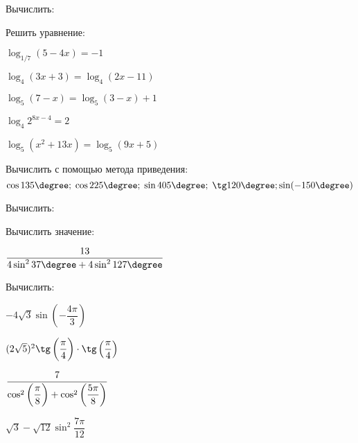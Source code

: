 \begin{listofex}
	\item Вычислить:
	\begin{enumcols}[itemcolumns=3]
		\item {}
		\item {}
		\item {}
		\item {}
		\item {}
		\item {}
		\item {}
	\end{enumcols}
	\item Решить уравнение:
	\begin{enumcols}[itemcolumns=2]
		\item \( \log_{1/7}(5-4x)=-1 \)
		\item \( \log_4(3x+3)=\log_4(2x-11) \)
		\item \( \log_5(7-x)=\log_5(3-x)+1 \)
		\item \( \log_4 2^{8x-4}=2 \)
		\item {}
		\item \( \log_5(x^2+13x)=\log_5(9x+5) \)
	\end{enumcols}
	\item Вычислить с помощью метода приведения:
	\[ \cos135\degree;\;\cos225\degree;\;\sin405\degree;\;\tg120\degree;\sin(-150\degree) \]
	\item Вычислить:
	\begin{enumcols}[itemcolumns=3]
		\item {}
		\item {}
		\item {}
		\item {}
		\item {}
	\end{enumcols}
	\item Вычислить значение:
	\begin{enumcols}[itemcolumns=3]
		\item {}
		\item \( \dfrac{13}{4\sin^237\degree+4\sin^2127\degree} \)
		\item {}
	\end{enumcols}
	\item Вычислить:
	\begin{enumcols}[itemcolumns=2]
		\item \( -4\sqrt{3}\sin\left( -\dfrac{4\pi}{3} \right) \)
		\item \( (2\sqrt{5})^2\tg\left( \dfrac{\vphantom{3}\pi}{4} \right)\cdot\tg\left( \dfrac{\pi}{4} \right) \)
		\item \( \dfrac{7}{\cos^2\left( \dfrac{\vphantom{9}\pi}{8} \right)+\cos^2\left( \dfrac{5\pi}{8} \right)} \)
		\item \( \sqrt{3}-\sqrt{12}\sin^2\dfrac{7\pi}{12} \)
	\end{enumcols}
	\item {}
\end{listofex}
